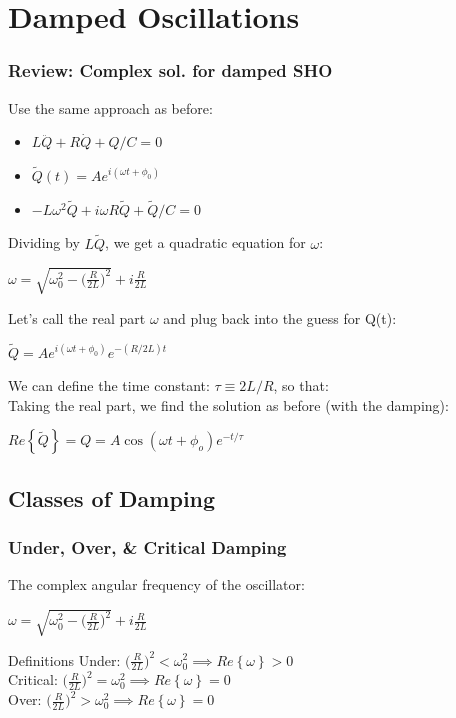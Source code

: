\documentclass[pdf,hideothersubsections]{beamer}
\begin{document}
\section{Damped Oscillations}
\begin{frame}
\frametitle{Review: Complex sol. for damped SHO}
Use the same approach as before:
\begin{itemize}
\item $L \ddot{Q} + R \dot{Q} + Q/C = 0$
\pause
\item $\tilde{Q}(t) = A e^{i (\omega t + \phi_0)}$
\pause
\item $-L \omega^2 \tilde{Q} + i \omega R \tilde{Q} + \tilde{Q}/C = 0$
\end{itemize}
\pause
Dividing by $L \tilde{Q}$, we get a quadratic equation for $\omega$: \\
\pause
\begin{center}
$\omega = \sqrt{\omega_0^2 - \Big(\frac{R}{2 L}\Big)^2} + i \frac{R}{2 L}$ \\
\end{center}
\pause
Let's call the real part $\omega$ and plug back into the guess for Q(t):
\pause
\begin{center}
$\tilde{Q} = A e^{i (\omega t + \phi_0)} e^{-(R/2 L) t}$\\
\end{center}
\pause
We can define the time constant: $\tau \equiv 2 L/R$, so that: \\
\pause
Taking the real part, we find the solution as before (with the damping): \\
\pause
\begin{center}
$Re\left\{\tilde{Q}\right\} = Q = A \cos(\omega t + \phi_o) e^{-t/\tau}$
\end{center}

\end{frame}

\subsection{Classes of Damping}
\begin{frame}
\frametitle{Under, Over, \& Critical Damping}
\pause
The complex angular frequency of the oscillator:

\begin{center}
$\omega = \sqrt{\omega_0^2 - \Big(\frac{R}{2 L}\Big)^2} + i \frac{R}{2 L}$ \\
\end{center}
\pause
\begin{block}{Definitions}
Under: $\Big(\frac{R}{2 L}\Big)^2 < \omega_0^2  \implies
Re\left\{\omega\right\} > 0$ \\
Critical: $\Big(\frac{R}{2 L}\Big)^2 = \omega_0^2 \implies
Re\left\{\omega\right\} = 0$ \\
Over: $\Big(\frac{R}{2 L}\Big)^2 > \omega_0^2 \implies
Re\left\{\omega\right\} = 0$
\end{block}


\end{frame}
\end{document}
